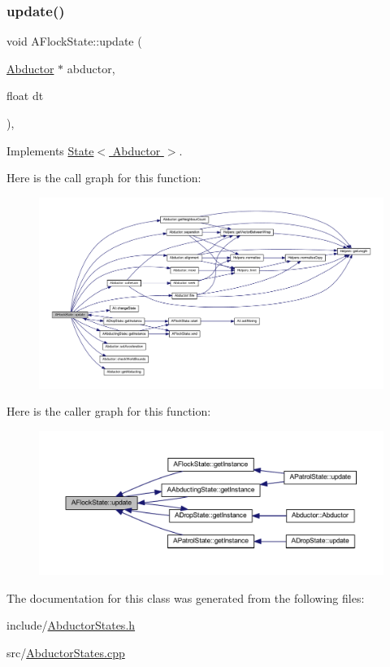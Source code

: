 \subsubsection{\texorpdfstring{update()}{update()}}
{\footnotesize\ttfamily void A\+Flock\+State\+::update (\begin{DoxyParamCaption}\item[{\hyperlink{class_abductor}{Abductor} $\ast$}]{abductor,  }\item[{float}]{dt }\end{DoxyParamCaption})\hspace{0.3cm}{\ttfamily [override]}, {\ttfamily [virtual]}}



Implements \hyperlink{class_state_a30b5f87ed3e3a05fafeaf898e43518ea}{State$<$ Abductor $>$}.

Here is the call graph for this function\+:
\nopagebreak
\begin{figure}[H]
\begin{center}
\leavevmode
\includegraphics[width=350pt]{class_a_flock_state_ac452fa27fac302918460575e5badae91_cgraph}
\end{center}
\end{figure}
Here is the caller graph for this function\+:
\nopagebreak
\begin{figure}[H]
\begin{center}
\leavevmode
\includegraphics[width=350pt]{class_a_flock_state_ac452fa27fac302918460575e5badae91_icgraph}
\end{center}
\end{figure}


The documentation for this class was generated from the following files\+:\begin{DoxyCompactItemize}
\item 
include/\hyperlink{_abductor_states_8h}{Abductor\+States.\+h}\item 
src/\hyperlink{_abductor_states_8cpp}{Abductor\+States.\+cpp}\end{DoxyCompactItemize}
